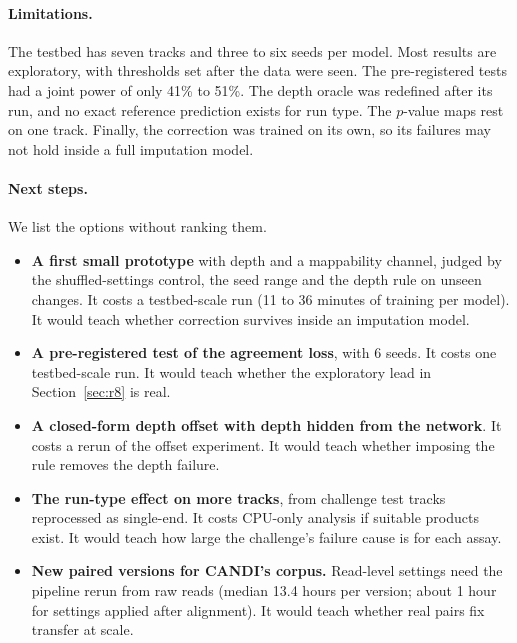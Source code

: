 \documentclass[pdflatex,sn-mathphys-num]{sn-jnl}
\newcommand{\lit}[1]{#1}
\newcommand{\costBam}{1}
\newcommand{\costFastq}{13.4}
\newcommand{\costTrHi}{36}
\newcommand{\costTrLo}{11}
\newcommand{\powJoint}{41}
\newcommand{\powPivot}{51}
\begin{document}
\paragraph{Limitations.} The testbed has seven tracks and three to six seeds per model. Most
results are exploratory, with thresholds set after the data were seen. The pre-registered tests
had a joint power of only \powJoint\% to \powPivot\%. The depth oracle was redefined after its
run, and no exact reference prediction exists for run type. The $p$-value maps rest on one track. Finally, the
correction was trained on its own, so its failures may not hold inside a full imputation model.

\paragraph{Next steps.} We list the options without ranking them.
\begin{itemize}
\item \textbf{A first small prototype} with depth and a mappability channel, judged by the
shuffled-settings control, the seed range and the depth rule on unseen changes. It costs a
testbed-scale run (\costTrLo{} to \costTrHi{} minutes of training per model). It would teach
whether correction survives inside an imputation model.
\item \textbf{A pre-registered test of the agreement loss}, with \lit{6} seeds. It costs one
testbed-scale run. It would teach whether the exploratory lead in Section~\ref{sec:r8} is real.
\item \textbf{A closed-form depth offset with depth hidden from the network}. It costs a rerun
of the offset experiment. It would teach whether imposing the rule removes the depth failure.
\item \textbf{The run-type effect on more tracks}, from challenge test tracks reprocessed as
single-end. It costs CPU-only analysis if suitable products exist. It would teach how large the
challenge's failure cause is for each assay.
\item \textbf{New paired versions for CANDI's corpus.} Read-level settings need the pipeline
rerun from raw reads (median \costFastq{} hours per version; about \costBam{} hour for settings
applied after alignment). It would teach whether real pairs fix transfer at scale.
\end{itemize}

\backmatter

\end{document}
